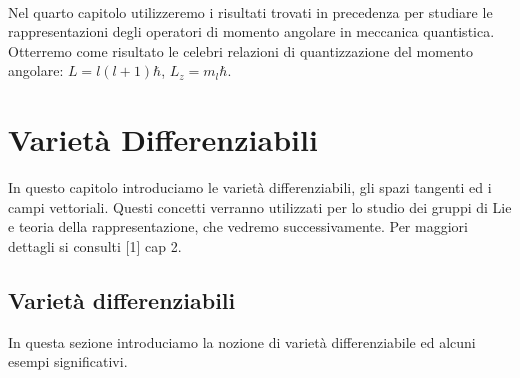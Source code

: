 \documentclass[12pt,a4paper]{report}
\theoremstyle{definition}
\theoremstyle{Theorem}
\theoremstyle{definition}
\theoremstyle{definition}
\theoremstyle{definition}
\begin{document}
	\\
	Nel quarto capitolo utilizzeremo i risultati trovati in precedenza per studiare le rappresentazioni degli operatori di momento angolare in meccanica quantistica. Otterremo come risultato le celebri relazioni di quantizzazione del momento angolare: $L=l(l+1)\hbar$, $L_z=m_l\hbar$.
\chapter{Varietà Differenziabili}
In questo capitolo introduciamo le varietà differenziabili, gli spazi tangenti ed i campi vettoriali. Questi concetti verranno utilizzati per lo studio dei gruppi di Lie e teoria della rappresentazione, che vedremo successivamente. Per maggiori dettagli si consulti [1] cap 2.
\section{Varietà differenziabili}
In questa sezione introduciamo la nozione di varietà differenziabile ed alcuni esempi significativi. 
\end{document}

